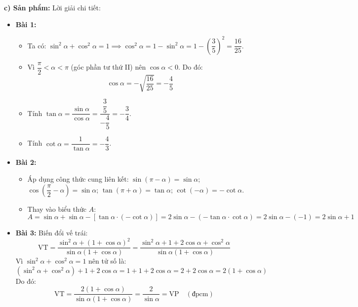 \documentclass[12pt, a4paper]{article}
\begin{document}
\textbf{c) Sản phẩm:} Lời giải chi tiết:
\begin{itemize}[leftmargin=0.6cm]
    \item \textbf{Bài 1:}
    \begin{itemize}[leftmargin=0.5cm]
        \item Ta có: $\sin^2\alpha + \cos^2\alpha = 1 \implies \cos^2\alpha = 1 - \sin^2\alpha = 1 - \left(\dfrac{3}{5}\right)^2 = \dfrac{16}{25}$.
        \item Vì $\dfrac{\pi}{2} < \alpha < \pi$ (góc phần tư thứ II) nên $\cos\alpha < 0$. Do đó:
        $$\cos\alpha = -\sqrt{\dfrac{16}{25}} = -\dfrac{4}{5}$$
        \item Tính $\tan\alpha = \dfrac{\sin\alpha}{\cos\alpha} = \dfrac{\dfrac{3}{5}}{-\dfrac{4}{5}} = -\dfrac{3}{4}$.
        \item Tính $\cot\alpha = \dfrac{1}{\tan\alpha} = -\dfrac{4}{3}$.
    \end{itemize}
    \item \textbf{Bài 2:}
    \begin{itemize}[leftmargin=0.5cm]
        \item Áp dụng công thức cung liên kết:
        $\sin(\pi - \alpha) = \sin\alpha$; $\cos\left(\dfrac{\pi}{2} - \alpha\right) = \sin\alpha$;
        $\tan(\pi + \alpha) = \tan\alpha$; $\cot(-\alpha) = -\cot\alpha$.
        \item Thay vào biểu thức $A$:
        $$A = \sin\alpha + \sin\alpha - [\tan\alpha \cdot (-\cot\alpha)] = 2\sin\alpha - (-\tan\alpha \cdot \cot\alpha) = 2\sin\alpha - (-1) = 2\sin\alpha + 1$$
    \end{itemize}
    \item \textbf{Bài 3:} Biến đổi vế trái:
    $$\text{VT} = \dfrac{\sin^2\alpha + (1 + \cos\alpha)^2}{\sin\alpha(1 + \cos\alpha)} = \dfrac{\sin^2\alpha + 1 + 2\cos\alpha + \cos^2\alpha}{\sin\alpha(1 + \cos\alpha)}$$
    Vì $\sin^2\alpha + \cos^2\alpha = 1$ nên tử số là:
    $$(\sin^2\alpha + \cos^2\alpha) + 1 + 2\cos\alpha = 1 + 1 + 2\cos\alpha = 2 + 2\cos\alpha = 2(1 + \cos\alpha)$$
    Do đó:
    $$\text{VT} = \dfrac{2(1 + \cos\alpha)}{\sin\alpha(1 + \cos\alpha)} = \dfrac{2}{\sin\alpha} = \text{VP} \quad (\text{đpcm})$$
\end{itemize}
\end{document}
